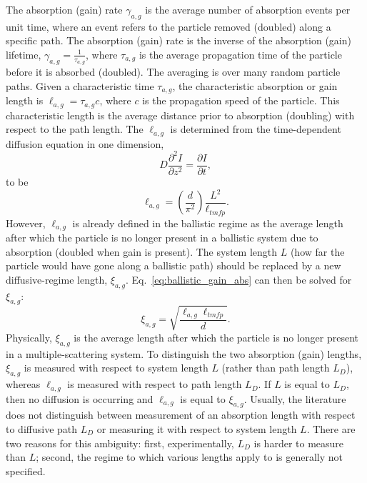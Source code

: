 The absorption (gain) rate $\gamma_{a,g}$ is the average number of absorption events per unit time, where an event refers to the particle removed (doubled) along a specific path. The absorption (gain) rate is the inverse of the absorption (gain) lifetime, 
$\gamma_{a,g} = \frac{1}{\tau_{a,g}}$, 
where $\tau_{a,g}$ is the average propagation time of the particle before it is absorbed (doubled). The averaging is over many random particle paths. Given a characteristic time $\tau_{a,g}$, the characteristic absorption or gain length is 
$\ell_{a,g} = \tau_{a,g} c$, 
where $c$ is the propagation speed of the particle. This characteristic length is the average distance prior to absorption (doubling) with respect to the path length. The $\ell_{a,g}$ is determined from the time-dependent diffusion equation in one dimension,
\begin{equation}
D \frac{\partial^2 I}{\partial z^2} = \frac{\partial I}{\partial t},
\label{eq:diffusion_equation_1D}
\end{equation}
to be 
\begin{equation}
\ell_{a,g}= \left( \frac{d}{\pi^2}\right) \frac{L^2}{\ell_{tmfp}}.
\label{eq:ballistic_gain_abs}
\end{equation}
However, $\ell_{a,g}$ is already defined in the ballistic regime as the average length after which the particle is no longer present in a ballistic system due to absorption (doubled when gain is present). The system length $L$ (how far the particle would have gone along a ballistic path) should be replaced by a new diffusive-regime length, $\xi_{a,g}$. Eq.~\ref{eq:ballistic_gain_abs} can then be solved for $\xi_{a,g}$:
\begin{equation}
 \xi_{a,g} = \sqrt{\frac{\ell_{a,g} \ell_{tmfp}}{d}}.
\label{eq:diffusive_absorption_length}
\end{equation}
Physically, $\xi_{a,g}$ is the average length after which the particle is no longer present in a multiple-scattering system. To distinguish the two absorption (gain) lengths, $\xi_{a,g}$ is measured with respect to system length $L$ (rather than path length $L_D$), whereas $\ell_{a,g}$ is measured with respect to path length $L_D$. If $L$ is equal to $L_D$, then no diffusion is occurring and $\ell_{a,g}$ is equal to $\xi_{a,g}$. Usually, the literature does not distinguish between measurement of an absorption length with respect to diffusive path $L_D$ or measuring it with respect to system length $L$. There are two reasons for this ambiguity: first, experimentally, $L_D$ is harder to measure than $L$; second, the regime to which various lengths apply to is generally not specified.

